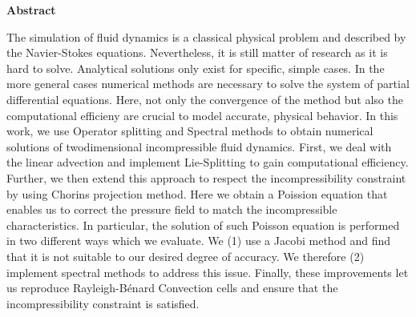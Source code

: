 \thispagestyle{empty}


\vspace*{1cm}

\begin{center}
    \textbf{Abstract}
    
\end{center}
    The simulation of fluid dynamics is a classical physical problem and described by the Navier-Stokes equations. 
    Nevertheless, it is still matter of research as it is hard to solve.
    Analytical solutions only exist for specific, simple cases.
    In the more general cases numerical methods are necessary to solve the system of partial differential equations.
    Here, not only the convergence of the method but also the computational efficieny are crucial to model accurate, physical behavior.
    In this work, we use Operator splitting and Spectral methods to obtain numerical solutions of twodimensional incompressible fluid dynamics.
    First, we deal with the linear advection and implement Lie-Splitting to gain computational efficiency.
    Further, we then extend this approach to respect the incompressibility constraint by using Chorins projection method.
    Here we obtain a Poission equation that enables us to correct the pressure field to match the incompressible characteristics.
    In particular, the solution of such Poisson equation is performed in two different ways which we evaluate.
    We (1) use a Jacobi method and find that it is not suitable to our desired degree of accuracy. 
    We therefore (2) implement spectral methods to address this issue.
    Finally, these improvements let us reproduce Rayleigh-B\'{e}nard Convection cells and ensure that the incompressibility constraint is satisfied.
\vspace*{1cm}

